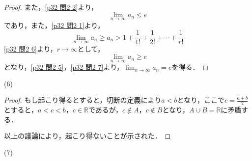\documentclass[dvipdfmx,uplatex,11pt]{jsarticle}
\theoremstyle{definition}
\begin{document}
\begin{leftbar}
\begin{proof}
		また，\eqref{p32 問2 2}より，
		\begin{equation}
			\label{p32 問2 5}
			\lim_{n \to \infty} a_n \le e
		\end{equation}
		であり，また，\eqref{p32 問2 1}より，
		\begin{equation}
			\label{p32 問2 6}
			\lim_{n \to \infty} a_n \ge a_n > 1 + \frac{1}{1!} + \frac{1}{2!} + \cdots + \frac{1}{r!}
		\end{equation}
		\eqref{p32 問2 6}より，$r \to \infty$として，
		\begin{equation}
			\label{p32 問2 7}
			\lim_{n \to \infty} a_n \ge e
		\end{equation}
		となり，\eqref{p32 問2 5}，\eqref{p32 問2 7}より，$\lim_{n \to \infty} a_n =e$を得る．
	\end{proof}
\end{leftbar}
\newpage
(6)
\begin{leftbar}
    \begin{proof}
        もし起こり得るとすると，切断の定義により$ a< b$となり，ここで$ c = \frac{a+b}{2}$とすると，$a < c < b$，$c \in \mathbb{R}$であるが，$ c \notin A$，$ c \notin B$となり，$ A \cup B = \mathbb{R}$に矛盾する．\par 
        以上の議論により，起こり得ないことが示された．
    \end{proof}
\end{leftbar}
\newpage
(7)
\end{document}
